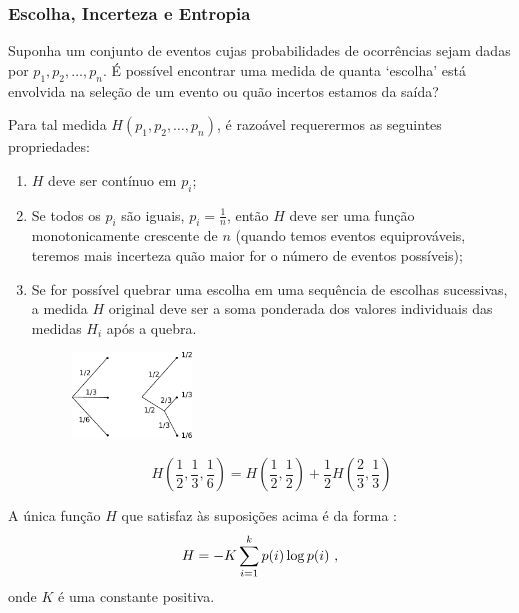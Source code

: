 \begin{frame}[allowframebreaks]
  \frametitle{Escolha, Incerteza e Entropia}
  Suponha um conjunto de eventos cujas probabilidades de ocorrências sejam dadas
  por $p_1, p_2, \ldots, p_n$. É possível encontrar uma medida de quanta `escolha' 
  está envolvida na seleção de um evento ou quão incertos estamos da saída?

  Para tal medida $H(p_1, p_2, \ldots, p_n)$, é razoável requerermos as seguintes propriedades:
  \begin{enumerate}
  \item $H$ deve ser contínuo em $p_i$;
  \item Se todos os $p_i$ são iguais, $p_i=\frac{1}{n}$, então $H$ deve ser uma função
  monotonicamente crescente de $n$ (quando temos eventos equiprováveis, teremos mais incerteza
  quão maior for o número de eventos possíveis);
  \item Se for possível quebrar uma escolha em uma sequência de escolhas sucessivas,
  a medida $H$ original deve ser a soma ponderada dos valores individuais das medidas
  $H_i$ após a quebra.
  
     \begin{figure}[h!]
     \centering
     \includegraphics[width=0.3\textwidth]{images/entr-quebra.pdf}
     \label{fig:entr-quebra}
     \end{figure}

  \begin{equation}
  H(\frac{1}{2},\frac{1}{3},\frac{1}{6}) = H(\frac{1}{2},\frac{1}{2}) + \frac{1}{2} H(\frac{2}{3},\frac{1}{3})
  \end{equation}
  \end{enumerate}

  A única função $H$ que satisfaz às suposições acima é da forma \cite{shannon1948}: 
  \begin{equation}\label{eq-K-entropia}
  H = - K \sum_{i=1}^{k} p(i) \log p(i) \textmd{ ,}
  \end{equation} 
  onde $K$ é uma constante positiva. 
\end{frame}




